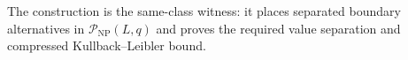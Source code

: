 The construction is the same-class witness: it places separated boundary alternatives in \(\mathcal P_{\mathrm{NP}}(L,q)\) and proves the required value separation and compressed Kullback--Leibler bound.